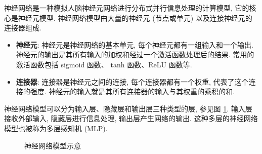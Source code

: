 \documentclass{ctexart}
\begin{document}
神经网络是一种模拟人脑神经元网络进行分布式并行信息处理的计算模型, 它的核心是神经元模型.
神经网络模型由大量的神经元 (节点或单元) 以及连接神经元的连接器组成\cite{mcculloch1943logical}.

\begin{itemize}
    \item {\bfseries 神经元}: 神经元是神经网络的基本单元, 每个神经元都有一组输入和一个输出.
          神经元的输出是其所有输入的加权和经过一个激活函数处理后的结果. 常用的激活函数包括 sigmoid 函数、
          tanh 函数、ReLU 函数等\cite{glorot2011deep}.
    \item {\bfseries 连接器}: 连接器是神经元之间的连接, 每个连接器都有一个权重,
          代表了这个连接的强度. 神经元的输入就是其所有连接器的输入与其权重的乘积的和\cite{rosenblatt1958perceptron}.
\end{itemize}

神经网络模型可以分为输入层、隐藏层和输出层三种类型的层, 参见图 \ref{fig::nn}. 输入层接收外部输入, 隐藏层进行信息处理,
输出层产生网络的输出. 这种多层的神经网络模型也被称为多层感知机 (MLP)\cite{rumelhart1986learning}.

\begin{figure}[htbp!]
    \centering
    \caption{神经网络模型示意}
    \label{fig::nn}
\end{figure}
\end{document}
